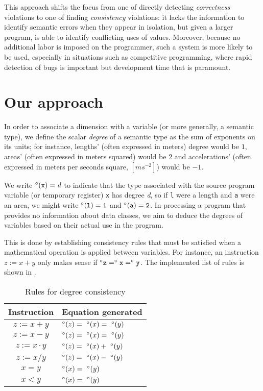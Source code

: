 \documentclass[12pt]{article}
\begin{document}
This approach shifts the focus from one of directly detecting \textit{correctness} violations to one of finding \textit{consistency} violations: it lacks the information to identify semantic errors when they appear in isolation, but given a larger program, is able to identify conflicting uses of values.
Moreover, because no additional labor is imposed on the programmer, such a system is more likely to be used, especially in situations such as competitive programming, where rapid detection of bugs is important but development time that is paramount.

\section{Our approach}
\label{sec:approach}

In order to associate a dimension with a variable (or more generally, a semantic type), we define the scalar \textit{degree} of a semantic type as the sum of exponents on its units; for instance, lengths' (often expressed in meters) degree would be $1$, areas' (often expressed in meters squared) would be $2$ and accelerations' (often expressed in meters per seconds square, $[m s^{-2}]$) would be $-1$.

We write $\degree(\tt{x}) = \it{d}$ to indicate that the type associated with the source program variable (or temporary register) \texttt{x} has degree \textit{d}, so if \texttt{l} were a length and \texttt{a} were an area, we might write $\degree(\tt{l}) = 1$ and $\degree(\tt{a}) = 2$.
In processing a program that provides no information about data classes, we aim to deduce the degrees of variables based on their actual use in the program.

This is done by establishing consistency rules that must be satisfied when a mathematical operation is applied between variables.
For instance, an instruction $z := x + y$ only makes sense if $\degree{\tt{z}} = \degree{\tt{x}} = \degree{\tt{y}}$.
The implemented list of rules is shown in .

\begin{table}[H]
  \centering
  \setlength{\tabcolsep}{20pt}
  \begin{tabular}{c | l}
    \textbf{Instruction} & \textbf{Equation generated} \\
    \hline
    $z := x + y$ & $\degree(z) =\ \degree(x) =\ \degree(y)$ \\
    $z := x - y$ & $\degree(z) =\ \degree(x) =\ \degree(y)$ \\
    $z := x \cdot y$ & $\degree(z) =\ \degree(x) +\ \degree(y)$ \\
    $z := x / y$ & $\degree(z) =\ \degree(x) -\ \degree(y)$ \\
    $x = y$ & $\degree(x) =\ \degree(y)$ \\
    $x < y$ & $\degree(x) =\ \degree(y)$ \\
  \end{tabular}
  \caption{Rules for degree consistency}
  \label{table:dimensional-rules}
\end{table}
\end{document}
